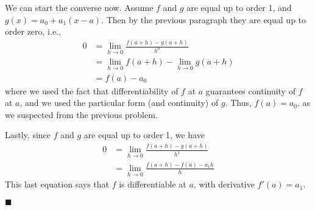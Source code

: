 \documentclass[12pt]{article}
\renewcommand{\qed}{\hfill$\blacksquare$}
\renewenvironment{proof}{\begin{addmargin}[1em]{0em}\begin{newproof}}{\end{newproof}\end{addmargin}\qed}
\begin{document}
\begin{proof}
\begin{itemize}
We can start the converse now. Assume $f$ and $g$ are equal up to order 1, and $g\left(x\right) = a_0 +a_1\left(x-a\right)$. Then by the previous paragraph they are equal up to order zero, i.e.,
\begin{equation*}\begin{split}
0 & =  \lim_{h\rightarrow 0} \frac{f\left(a+h\right)-g\left(a+h\right)}{h^0} \\ & = \lim_{h\rightarrow 0} f\left(a+h\right) - \lim_{h\rightarrow 0} g\left(a+h\right) \\
& = f\left(a\right) - a_0
\end{split}\end{equation*}
where we used the fact that differentiability of $f$ at $a$ guarantees continuity of $f$ at $a$, and we used the particular form (and continuity) of $g$. Thus, $f\left(a\right) = a_0$, as we suspected from the previous problem. 

Lastly, since $f$ and $g$ are equal up to order 1, we have
\begin{equation*}\begin{split}
0 & = \lim_{h\rightarrow 0} \frac{f\left(a+h\right) - g\left(a+h\right)}{h^1} \\
& = \lim_{h\rightarrow 0} \frac{f\left(a+h\right)-f\left(a\right) - a_1 h}{h}
\end{split}\end{equation*}
This last equation says that $f$ is differentiable at $a$, with derivative $f'\left(a\right) = a_1$. \\


\end{itemize}
\end{proof}
\end{document}
